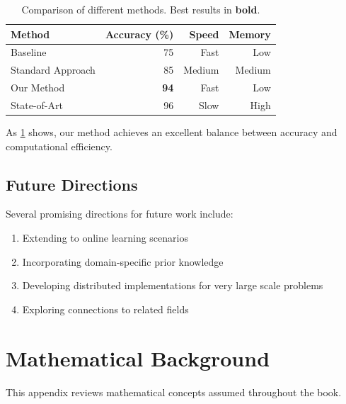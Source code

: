 \documentclass[11pt,twoside,openright]{book}
\theoremstyle{plain}
\theoremstyle{definition}
\theoremstyle{remark}
\begin{document}
\begin{table}[tbp]
    \centering
    \caption{Comparison of different methods. Best results in \textbf{bold}.}
    \label{tab:method-comparison}
    \begin{tabular}{@{}lrrr@{}}
        \toprule
        \textbf{Method} & \textbf{Accuracy (\%)} & \textbf{Speed} & \textbf{Memory} \\
        \midrule
        Baseline          & 75 & Fast   & Low    \\
        Standard Approach & 85 & Medium & Medium \\
        Our Method        & \textbf{94} & Fast   & Low    \\
        State-of-Art      & 96 & Slow   & High   \\
        \bottomrule
    \end{tabular}
\end{table}

As \cref{tab:method-comparison} shows, our method achieves an excellent balance between accuracy and computational efficiency.

\section{Future Directions}
\label{sec:app2-future}

Several promising directions for future work include:

\begin{enumerate}[itemsep=0.3em]
    \item Extending to online learning scenarios
    \item Incorporating domain-specific prior knowledge
    \item Developing distributed implementations for very large scale problems
    \item Exploring connections to related fields
\end{enumerate}

\backmatter

\appendix

\chapter{Mathematical Background}
\label{app:math}

This appendix reviews mathematical concepts assumed throughout the book.
\end{document}
